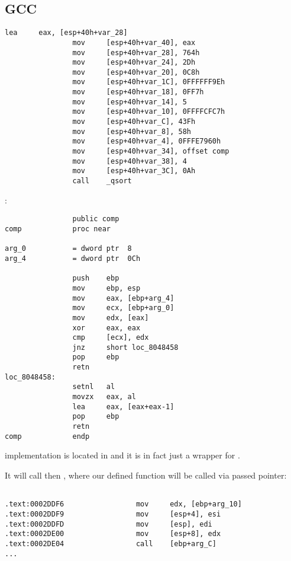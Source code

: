 \subsection{GCC}


\begin{lstlisting}[caption=GCC]
                lea     eax, [esp+40h+var_28]
                mov     [esp+40h+var_40], eax
                mov     [esp+40h+var_28], 764h
                mov     [esp+40h+var_24], 2Dh
                mov     [esp+40h+var_20], 0C8h
                mov     [esp+40h+var_1C], 0FFFFFF9Eh
                mov     [esp+40h+var_18], 0FF7h
                mov     [esp+40h+var_14], 5
                mov     [esp+40h+var_10], 0FFFFCFC7h
                mov     [esp+40h+var_C], 43Fh
                mov     [esp+40h+var_8], 58h
                mov     [esp+40h+var_4], 0FFFE7960h
                mov     [esp+40h+var_34], offset comp
                mov     [esp+40h+var_38], 4
                mov     [esp+40h+var_3C], 0Ah
                call    _qsort
\end{lstlisting}

:

\begin{lstlisting}
                public comp
comp            proc near

arg_0           = dword ptr  8
arg_4           = dword ptr  0Ch

                push    ebp
                mov     ebp, esp
                mov     eax, [ebp+arg_4]
                mov     ecx, [ebp+arg_0]
                mov     edx, [eax]
                xor     eax, eax
                cmp     [ecx], edx
                jnz     short loc_8048458
                pop     ebp
                retn
loc_8048458:
                setnl   al
                movzx   eax, al
                lea     eax, [eax+eax-1]
                pop     ebp
                retn
comp            endp
\end{lstlisting}

{\qsort implementation is located in  and it is in fact just a wrapper for .}

{It will call then , where our defined function will be called via passed pointer:}


\begin{lstlisting}[caption=
\IFRU{(файл libc.so.6, версия glibc ~--- 2.10.1)}{(File libc.so.6, glibc version ~--- 2.10.1)}]

.text:0002DDF6                 mov     edx, [ebp+arg_10]
.text:0002DDF9                 mov     [esp+4], esi
.text:0002DDFD                 mov     [esp], edi
.text:0002DE00                 mov     [esp+8], edx
.text:0002DE04                 call    [ebp+arg_C]
...
\end{lstlisting}
